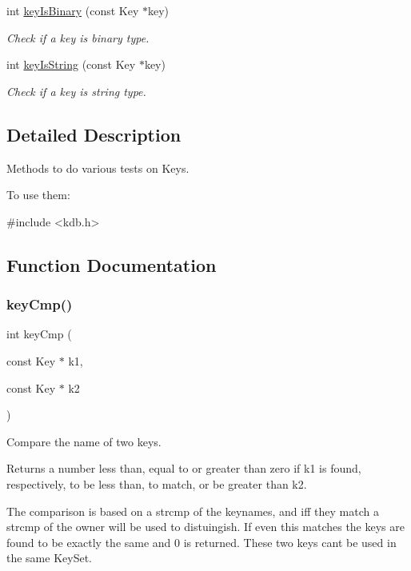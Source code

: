 \begin{DoxyCompactItemize}
int \hyperlink{group__keytest_ga9526b371087564e43e3dff8ad0dac949}{key\+Is\+Binary} (const Key $\ast$key)
\begin{DoxyCompactList}\small\item\em Check if a key is binary type. \end{DoxyCompactList}\item 
int \hyperlink{group__keytest_gaea7670778abd07fee0fe8ac12a149190}{key\+Is\+String} (const Key $\ast$key)
\begin{DoxyCompactList}\small\item\em Check if a key is string type. \end{DoxyCompactList}\end{DoxyCompactItemize}


\subsection{Detailed Description}
Methods to do various tests on Keys. 

To use them\+: 
\begin{DoxyCode}
\textcolor{preprocessor}{#include <kdb.h>}
\end{DoxyCode}
 

\subsection{Function Documentation}
\mbox{\label{group__keytest_gaf6e66e12fe04d535a5d1c8218ced803e}} 
\subsubsection{\texorpdfstring{key\+Cmp()}{keyCmp()}}
{\footnotesize\ttfamily int key\+Cmp (\begin{DoxyParamCaption}\item[{const Key $\ast$}]{k1,  }\item[{const Key $\ast$}]{k2 }\end{DoxyParamCaption})}



Compare the name of two keys. 

\begin{DoxyReturn}{Returns}
a number less than, equal to or greater than zero if k1 is found, respectively, to be less than, to match, or be greater than k2.
\end{DoxyReturn}
The comparison is based on a strcmp of the keynames, and iff they match a strcmp of the owner will be used to distuingish. If even this matches the keys are found to be exactly the same and 0 is returned. These two keys can\textquotesingle{}t be used in the same Key\+Set.

